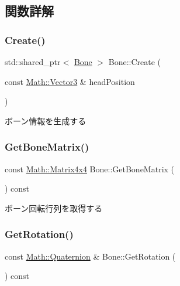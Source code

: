 \subsection{関数詳解}
\mbox{\label{class_bone_af837ae78ad27ca34d5adf52db611dc47}} 
\subsubsection{\texorpdfstring{Create()}{Create()}}
{\footnotesize\ttfamily std\+::shared\+\_\+ptr$<$ \mbox{\hyperlink{class_bone}{Bone}} $>$ Bone\+::\+Create (\begin{DoxyParamCaption}\item[{const \mbox{\hyperlink{struct_math_1_1_vector3}{Math\+::\+Vector3}} \&}]{head\+Position }\end{DoxyParamCaption})\hspace{0.3cm}{\ttfamily [static]}}



ボーン情報を生成する 

\mbox{\label{class_bone_ae87eaca1d2bd48b7f77668792686c5f8}} 
\subsubsection{\texorpdfstring{Get\+Bone\+Matrix()}{GetBoneMatrix()}}
{\footnotesize\ttfamily const \mbox{\hyperlink{struct_math_1_1_matrix4x4}{Math\+::\+Matrix4x4}} Bone\+::\+Get\+Bone\+Matrix (\begin{DoxyParamCaption}{ }\end{DoxyParamCaption}) const}



ボーン回転行列を取得する 

\mbox{\label{class_bone_a4994c5b3c7412465cc78a6f9ac1d6e23}} 
\subsubsection{\texorpdfstring{Get\+Rotation()}{GetRotation()}}
{\footnotesize\ttfamily const \mbox{\hyperlink{struct_math_1_1_quaternion}{Math\+::\+Quaternion}} \& Bone\+::\+Get\+Rotation (\begin{DoxyParamCaption}{ }\end{DoxyParamCaption}) const}



